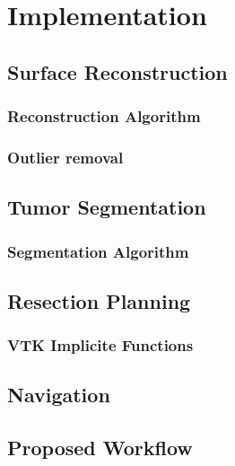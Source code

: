 \chapter{Implementation}
\section{Surface Reconstruction}
\subsection{Reconstruction Algorithm}
\subsection{Outlier removal}
\section{Tumor Segmentation}
\subsection{Segmentation Algorithm}
\section{Resection Planning}
\subsection{VTK Implicite Functions}
\section{Navigation}
\section{Proposed Workflow}